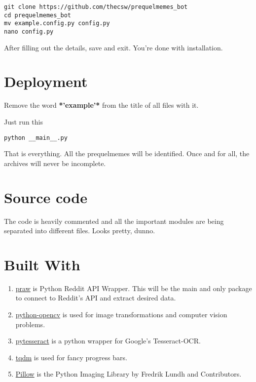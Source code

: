 \documentclass[11pt]{article}
\begin{document}
\begin{verbatim}
git clone https://github.com/thecsw/prequelmemes_bot
cd prequelmemes_bot
mv example.config.py config.py
nano config.py
\end{verbatim}

After filling out the details, save and exit. You're done with installation.

\section{Deployment}
\label{sec-3}

Remove the word \textbf{*'example'*} from the title of all files with it.

Just run this

\begin{verbatim}
python __main__.py
\end{verbatim}

That is everything. All the prequelmemes will be identified. Once and for all,
the archives will never be incomplete.

\section{Source code}
\label{sec-4}

The code is heavily commented and all the important modules are being separated into different files. Looks pretty, dunno.

\section{Built With}
\label{sec-5}
\begin{enumerate}
\item \href{https://github.com/praw-dev/praw}{praw} is Python Reddit API Wrapper. This will be the main and only package to
connect to Reddit's API and extract desired data.
\item \href{https://pypi.python.org/pypi/opencv-python}{python-opencv} is used for image transformations and computer vision problems.
\item \href{https://pypi.python.org/pypi/pytesseract}{pytesseract} is a python wrapper for Google's Tesseract-OCR.
\item \href{https://pypi.python.org/pypi/tqdm}{tqdm} is used for fancy progress bars.
\item \href{https://pillow.readthedocs.io/en/latest/}{Pillow} is the Python  Imaging Library by Fredrik Lundh and Contributors.
\end{enumerate}
\end{document}
